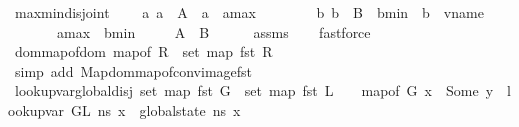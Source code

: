 \begin{isabellebody}
\endisatagproof
{\isafoldproof}%
%
\isadelimproof
\isanewline
%
\endisadelimproof
\isanewline
{}\isamarkupfalse%
\ max{\isacharunderscore}{\kern0pt}min{\isacharunderscore}{\kern0pt}disjoint{\isacharunderscore}{\kern0pt}{}{\isacharcolon}{\kern0pt}\isanewline
\ \ \ {\isachardoublequoteopen}{\isasymforall}\ a{\isachardot}{\kern0pt}\ a\ {\isasymin}\ A\ {\isasymlongrightarrow}\ a\ {\isasymle}\ a{\isacharunderscore}{\kern0pt}max{\isachardoublequoteclose}\isanewline
\ \ \ \ \ \ \ {\isachardoublequoteopen}{\isasymforall}\ b{\isachardot}{\kern0pt}\ b\ {\isasymin}\ B\ {\isasymlongrightarrow}\ b{\isacharunderscore}{\kern0pt}min\ {\isasymle}\ {\isacharparenleft}{\kern0pt}b\ {\isacharcolon}{\kern0pt}{\isacharcolon}{\kern0pt}\ vname{\isacharparenright}{\kern0pt}{\isachardoublequoteclose}\isanewline
\ \ \ \ \ \ \ {\isachardoublequoteopen}a{\isacharunderscore}{\kern0pt}max\ {\isacharless}{\kern0pt}\ b{\isacharunderscore}{\kern0pt}min{\isachardoublequoteclose}\isanewline
\ \ \ \ \ {\isachardoublequoteopen}A\ {\isasyminter}\ B\ {\isacharequal}{\kern0pt}\ {\isacharbraceleft}{\kern0pt}{\isacharbraceright}{\kern0pt}{\isachardoublequoteclose}\isanewline
%
\isadelimproof
\ \ %
\endisadelimproof
%
\isatagproof
{}\isamarkupfalse%
\ assms\isanewline
\ \ \isamarkupfalse%
\ fastforce%
\endisatagproof
{\isafoldproof}%
%
\isadelimproof
\isanewline
%
\endisadelimproof
\isanewline
{}\isamarkupfalse%
\ dom{\isacharunderscore}{\kern0pt}map{\isacharunderscore}{\kern0pt}of{\isacharunderscore}{\kern0pt}{}{\isacharcolon}{\kern0pt}{\isachardoublequoteopen}dom\ {\isacharparenleft}{\kern0pt}map{\isacharunderscore}{\kern0pt}of\ R{\isacharparenright}{\kern0pt}\ {\isacharequal}{\kern0pt}\ set\ {\isacharparenleft}{\kern0pt}map\ fst\ R{\isacharparenright}{\kern0pt}{\isachardoublequoteclose}\isanewline
%
\isadelimproof
\ \ %
\endisadelimproof
%
\isatagproof
{}\isamarkupfalse%
\ {\isacharparenleft}{\kern0pt}simp\ add{\isacharcolon}{\kern0pt}\ Map{\isachardot}{\kern0pt}dom{\isacharunderscore}{\kern0pt}map{\isacharunderscore}{\kern0pt}of{\isacharunderscore}{\kern0pt}conv{\isacharunderscore}{\kern0pt}image{\isacharunderscore}{\kern0pt}fst{\isacharparenright}{\kern0pt}%
\endisatagproof
{\isafoldproof}%
%
\isadelimproof
\isanewline
%
\endisadelimproof
\isanewline
{}\isamarkupfalse%
\ lookup{\isacharunderscore}{\kern0pt}var{\isacharunderscore}{\kern0pt}global{\isacharunderscore}{\kern0pt}disj{\isacharcolon}{\kern0pt}\ {\isachardoublequoteopen}set\ {\isacharparenleft}{\kern0pt}map\ fst\ G{\isacharparenright}{\kern0pt}\ {\isasyminter}\ set\ {\isacharparenleft}{\kern0pt}map\ fst\ L{\isacharparenright}{\kern0pt}\ {\isacharequal}{\kern0pt}\ {\isacharbraceleft}{\kern0pt}{\isacharbraceright}{\kern0pt}\ {\isasymLongrightarrow}\ map{\isacharunderscore}{\kern0pt}of\ G\ x\ {\isacharequal}{\kern0pt}\ Some\ y\ {\isasymLongrightarrow}\ lookup{\isacharunderscore}{\kern0pt}var\ {\isacharparenleft}{\kern0pt}G{\isacharcomma}{\kern0pt}L{\isacharparenright}{\kern0pt}\ n{\isacharunderscore}{\kern0pt}s\ x\ {\isacharequal}{\kern0pt}\ global{\isacharunderscore}{\kern0pt}state\ n{\isacharunderscore}{\kern0pt}s\ x{\isachardoublequoteclose}\isanewline

\end{isabellebody}
